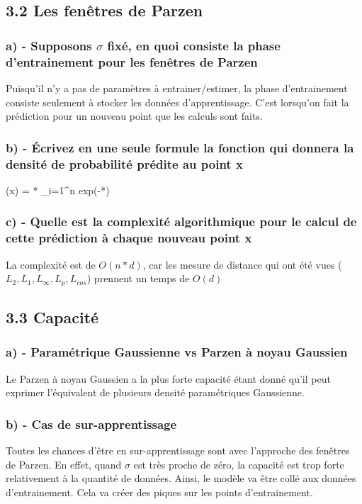 \documentclass[12pt]{article}
\newenvironment{eqs*}{\begin{equation*}\begin{aligned}}{\end{aligned}\end{equation*}}
\begin{document}
\subsection{3.2 Les fenêtres de Parzen}
\subsubsection{a) - Supposons $\sigma$ fixé, en quoi consiste la phase d'entrainement pour les fenêtres de Parzen}

Puisqu'il n'y a pas de paramètres à entrainer/estimer, la phase d'entrainement consiste seulement à stocker les données d'apprentissage.
C'est lorsqu'on fait la prédiction pour un nouveau point que les calculs sont faits.

\subsubsection{b) - Écrivez en une seule formule la fonction qui donnera la densité de probabilité prédite au point x}
\begin{eqs*}
	(x) = * \sum_{i=1}^{n} exp(-*)
\end{eqs*}

\subsubsection{c) - Quelle est la complexité algorithmique pour le calcul de cette prédiction à chaque nouveau point x}
La complexité est de $O(n*d)$, car les mesure de distance qui ont été vues ($L_{2},  L_{1},  L_{\infty},  L_{p},  L_{cos}$) prennent un temps de $O(d)$  

\subsection{3.3 Capacité}
\subsubsection{a) - Paramétrique Gaussienne vs Parzen à noyau Gaussien}
Le Parzen à noyau Gaussien a la plus forte capacité étant donné qu'il peut exprimer l'équivalent de plusieurs densité paramétriques Gaussienne. 
\subsubsection{b) - Cas de sur-apprentissage}
Toutes les chances d'être en sur-apprentissage sont avec l'approche des fenêtres de Parzen. En effet, quand $\sigma$ est très proche de zéro, la capacité est trop forte relativement à la quantité de données. Ainsi, le modèle va être collé aux données d'entrainement. Cela va créer des piques sur les points d'entrainement. 
\end{document}
